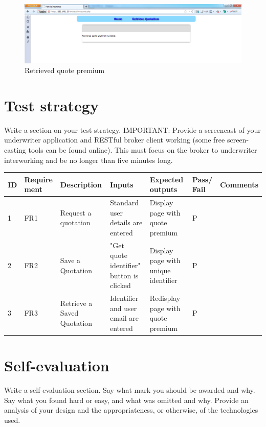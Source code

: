 \documentclass[10pt,a4paper,headinclude=true,twoside]{report}
\begin{document}
\begin{figure}[H]
\centering
\centerline{\includegraphics[scale=0.45]{./retrievedquote}}
\caption{Retrieved quote premium}
\label{fig:retrievedquote}
\end{figure} 


\section{Test strategy}
Write a section on your test strategy. IMPORTANT: Provide a
screencast of your underwriter application and RESTful broker client
working (some free screen-casting tools can be found online). This
must focus on the broker to underwriter interworking and be no longer
than five minutes long.

\begin{center}
\begin{tabularx}{\textwidth} { |p{0.14cm}|p{0.88cm}|X|X|X|p{0.6cm}|X|}
   \hline                        
  ID &  Require ment & Description &  Inputs  &  Expected outputs & Pass/ Fail & Comments  \\ \hline
   1 & FR1 &  Request a quotation & Standard user details are entered &  Display page with quote premium & P &  \\ \hline
   2 & FR2 & Save a Quotation & "Get quote identifier" button is clicked &  Display page with unique identifier & P &  \\ \hline
   3 & FR3 & Retrieve a Saved Quotation & Identifier and user email are entered &  Redisplay page with quote premium & P & \\ \hline
   
   \hline  
\end{tabularx}
\end{center}
\section{Self-evaluation}
Write a self-evaluation section. Say what mark you should be awarded
and why. Say what you found hard or easy, and what was omitted and
why. Provide an analysis of your design and the appropriateness, or
otherwise, of the technologies used.



\end{document}
